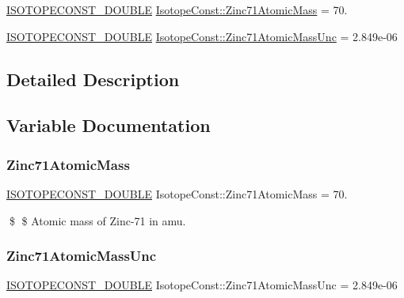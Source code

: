 \begin{DoxyCompactItemize}
\item 
\mbox{\hyperlink{group___isotope_const-_macros_ga8f45a7272ce02c0b4c65c44636ed719a}{I\+S\+O\+T\+O\+P\+E\+C\+O\+N\+S\+T\+\_\+\+D\+O\+U\+B\+LE}} \mbox{\hyperlink{group___isotope_const-_zinc-_zn71_gab7c3f2c71dd97f074173b609e84d40b4}{Isotope\+Const\+::\+Zinc71\+Atomic\+Mass}} = 70.
\item 
\mbox{\hyperlink{group___isotope_const-_macros_ga8f45a7272ce02c0b4c65c44636ed719a}{I\+S\+O\+T\+O\+P\+E\+C\+O\+N\+S\+T\+\_\+\+D\+O\+U\+B\+LE}} \mbox{\hyperlink{group___isotope_const-_zinc-_zn71_ga5fcf9a1f53a368e839f15fc0846499f0}{Isotope\+Const\+::\+Zinc71\+Atomic\+Mass\+Unc}} = 2.\+849e-\/06
\end{DoxyCompactItemize}


\subsection{Detailed Description}


\subsection{Variable Documentation}
\mbox{\label{group___isotope_const-_zinc-_zn71_gab7c3f2c71dd97f074173b609e84d40b4}} 
\subsubsection{\texorpdfstring{Zinc71\+Atomic\+Mass}{Zinc71AtomicMass}}
{\footnotesize\ttfamily \mbox{\hyperlink{group___isotope_const-_macros_ga8f45a7272ce02c0b4c65c44636ed719a}{I\+S\+O\+T\+O\+P\+E\+C\+O\+N\+S\+T\+\_\+\+D\+O\+U\+B\+LE}} Isotope\+Const\+::\+Zinc71\+Atomic\+Mass = 70.}

\$ \$ Atomic mass of Zinc-\/71 in amu. \mbox{\label{group___isotope_const-_zinc-_zn71_ga5fcf9a1f53a368e839f15fc0846499f0}} 
\subsubsection{\texorpdfstring{Zinc71\+Atomic\+Mass\+Unc}{Zinc71AtomicMassUnc}}
{\footnotesize\ttfamily \mbox{\hyperlink{group___isotope_const-_macros_ga8f45a7272ce02c0b4c65c44636ed719a}{I\+S\+O\+T\+O\+P\+E\+C\+O\+N\+S\+T\+\_\+\+D\+O\+U\+B\+LE}} Isotope\+Const\+::\+Zinc71\+Atomic\+Mass\+Unc = 2.\+849e-\/06}


